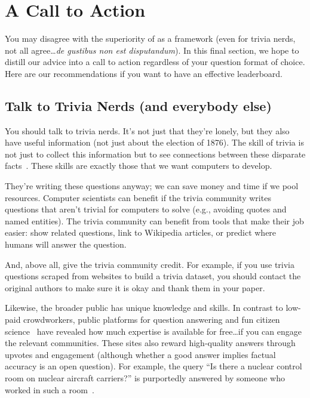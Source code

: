 
\section{A Call to Action}
\label{sec:call}


You may disagree with the superiority of \qb{} as a \qa{} framework (even for trivia nerds, not all agree\dots \textit{de gustibus non est disputandum}).
In this final section, we hope to distill our advice into a call to action regardless of your question format of choice.
Here are our recommendations if you want to have an effective leaderboard.

\subsection{Talk to Trivia Nerds (and everybody else)}

You should talk to trivia nerds.
It's not just that they're lonely, but they also have useful information (not just about the election of 1876).
The skill of trivia is not just to collect this information but to see connections between these disparate facts~\cite{jennings-06}.
These skills are exactly those that we want computers to develop.

They're writing these questions anyway; we can save money and time if we pool resources.
Computer scientists can benefit if the trivia community writes questions that aren't trivial for computers to solve (e.g., avoiding quotes and named entities).
The trivia community can benefit from tools that make their job easier: show related questions, link to Wikipedia articles, or predict where humans will answer the question.

And, above all, give the trivia community credit.
For example, if you use trivia questions scraped from websites to build a trivia \qa{} dataset, you should contact the original authors to make sure it is okay and thank them in your paper.  

Likewise, the broader public has unique knowledge and skills.
In contrast to low-paid crowdworkers, public platforms for question answering and fun citizen science~\cite{bowser-13} have revealed how much expertise is available for free\dots if you can engage the relevant communities.
These sites also reward high-quality answers through upvotes and engagement (although whether a good answer implies factual accuracy is an open question).
For example, the  query ``Is there a nuclear control room on nuclear aircraft carriers?'' is purportedly answered by someone who worked in such a room~\cite{humphries-17}.


